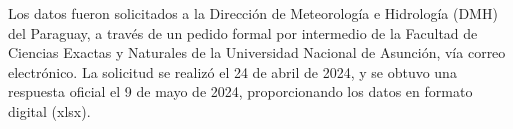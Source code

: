 Los datos fueron solicitados a la Dirección de Meteorología e Hidrología (DMH) del Paraguay, a través de un pedido formal por intermedio de la Facultad de Ciencias Exactas y Naturales de la Universidad Nacional de Asunción, vía correo electrónico. La solicitud se realizó el 24 de abril de 2024, y se obtuvo una respuesta oficial el 9 de mayo de 2024, proporcionando los datos en formato digital (xlsx).

\clearpage %



